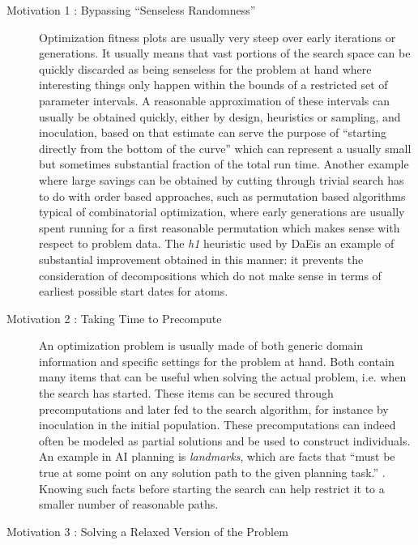 \documentclass[english]{DESCARWINreport}
\newcommand{\DAE}{{\sc DaE}}
\begin{document}
\begin{description}

\item[Motivation 1 : Bypassing ``Senseless Randomness''] 

Optimization fitness plots are usually very steep over early iterations or generations. It usually means that vast portions of the search space can be quickly discarded as being senseless for the problem at hand where interesting things only happen within the bounds of a restricted set of parameter intervals. A reasonable approximation of these intervals can usually be obtained quickly, either by design, heuristics or sampling, and inoculation, based on that estimate can serve the purpose of ``starting directly from the bottom of the curve'' which can represent a usually small but sometimes substantial fraction of the total run time. Another example where large savings can be obtained by cutting through trivial search has to do with order based approaches, such as permutation based algorithms typical of combinatorial optimization, where early generations are usually spent running for a first reasonable permutation which makes sense with respect to problem data. The \emph{h1} heuristic used by \DAE is an example of substantial improvement obtained in this manner: it prevents the consideration of decompositions which do not make sense in terms of earliest possible start dates for atoms.

\item[Motivation 2 : Taking Time to Precompute]

An optimization problem is usually made of both generic domain information and specific settings for the problem at hand. Both contain many items that can be useful when solving the actual problem, i.e. when the search has started. These items can be secured through precomputations and later fed to the search algorithm, for instance by inoculation in the initial population. These precomputations can indeed often be modeled as partial solutions and be used to construct individuals. An example in AI planning is \emph{landmarks}, which are facts that ``must be true at some point on any solution path to the given planning task.'' \cite{DBLP:journals/corr/abs-1107-0052}. Knowing such facts before starting the search can help restrict it to a smaller number of reasonable paths.

\item[Motivation 3 : Solving a Relaxed Version of the Problem]


\end{description}
\end{document}
